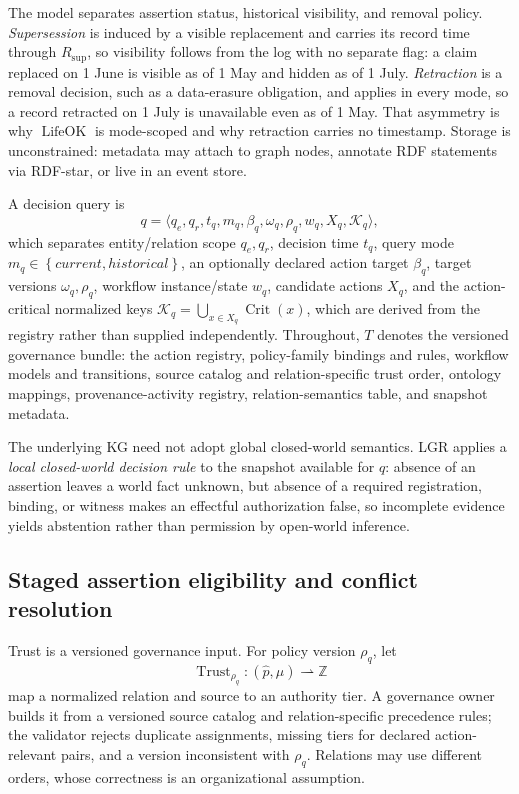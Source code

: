 \documentclass[conference]{IEEEtran}
\newcommand{\lgr}{\textsc{LGR}\xspace}
\newcommand{\set}[1]{\left\{#1\right\}}
\begin{document}
The model separates assertion status, historical visibility, and removal policy. \emph{Supersession} is induced by a visible replacement and carries its record time through $R_{\mathrm{sup}}$, so visibility follows from the log with no separate flag: a claim replaced on 1 June is visible as of 1 May and hidden as of 1 July. \emph{Retraction} is a removal decision, such as a data-erasure obligation, and applies in every mode, so a record retracted on 1 July is unavailable even as of 1 May. That asymmetry is why $\operatorname{LifeOK}$ is mode-scoped and why retraction carries no timestamp. Storage is unconstrained: metadata may attach to graph nodes, annotate RDF statements via RDF-star, or live in an event store.

A decision query is
\begin{equation}
q=\langle q_e,q_r,t_q,m_q,\beta_q,\omega_q,\rho_q,w_q,X_q,\mathcal{K}_q\rangle,
\label{eq:query}
\end{equation}
which separates entity/relation scope $q_e,q_r$, decision time $t_q$, query mode $m_q\in\set{\mathit{current},\mathit{historical}}$, an optionally declared action target $\beta_q$, target versions $\omega_q,\rho_q$, workflow instance/state $w_q$, candidate actions $X_q$, and the action-critical normalized keys $\mathcal{K}_q=\bigcup_{x\in X_q}\operatorname{Crit}(x)$, which are derived from the registry rather than supplied independently. Throughout, $T$ denotes the versioned governance bundle: the action registry, policy-family bindings and rules, workflow models and transitions, source catalog and relation-specific trust order, ontology mappings, provenance-activity registry, relation-semantics table, and snapshot metadata.

The underlying KG need not adopt global closed-world semantics. \lgr applies a \emph{local closed-world decision rule} to the snapshot available for $q$: absence of an assertion leaves a world fact unknown, but absence of a required registration, binding, or witness makes an effectful authorization false, so incomplete evidence yields abstention rather than permission by open-world inference.


\subsection{Staged assertion eligibility and conflict resolution}
Trust is a versioned governance input. For policy version $\rho_q$, let
\begin{equation}
\operatorname{Trust}_{\rho_q}:(\hat p,\mu)\rightharpoonup\mathbb{Z}
\label{eq:trust}
\end{equation}
map a normalized relation and source to an authority tier. A governance owner builds it from a versioned source catalog and relation-specific precedence rules; the validator rejects duplicate assignments, missing tiers for declared action-relevant pairs, and a version inconsistent with $\rho_q$. Relations may use different orders, whose correctness is an organizational assumption.
\end{document}
